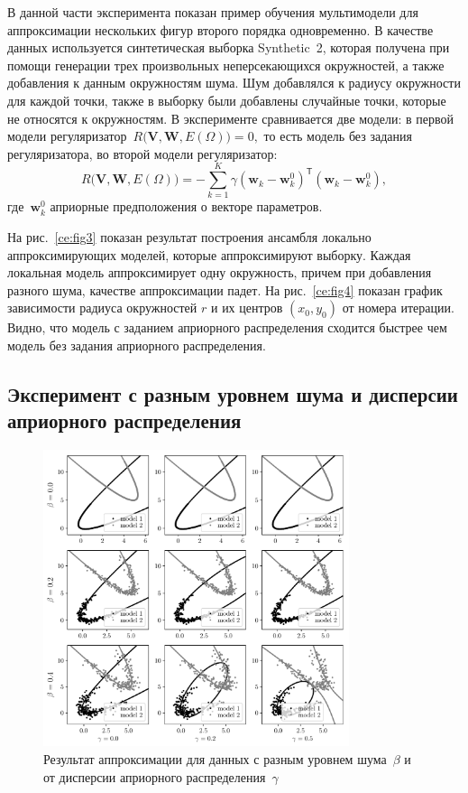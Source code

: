 \documentclass[12pt, twoside]{article}
\numberwithin{equation}{section}
\begin{document}
В данной части эксперимента показан пример обучения мультимодели для аппроксимации нескольких фигур второго порядка одновременно. В качестве данных используется синтетическая выборка Synthetic~2, которая получена при помощи генерации трех произвольных неперсекающихся окружностей, а также добавления к данным окружностям шума. Шум добавлялся к радиусу окружности для каждой точки, также в выборку были добавлены случайные точки, которые не относятся к окружностям. В эксперименте сравнивается две модели: в первой модели регуляризатор~$R\bigl(\mathbf{V}, \mathbf{W}, E(\Omega)\bigr)=0,$ то есть модель без задания регуляризатора, во второй модели регуляризатор:
\[
R\bigl(\mathbf{V}, \mathbf{W}, E(\Omega)\bigr)= -\sum_{k=1}^{K}\gamma\left(\mathbf{w}_k - \mathbf{w}_k^{0}\right)^{\mathsf{T}}\left(\mathbf{w}_k - \mathbf{w}_k^{0}\right),
\]
где~$\mathbf{w}_k^{0}$ априорные предположения о векторе параметров.

На рис.~\ref{ce:fig3} показан результат построения ансамбля локально аппроксимирующих моделей, которые аппроксимируют выборку. Каждая локальная модель аппроксимирует одну окружность, причем при добавления разного шума, качестве аппроксимации падет.
На рис.~\ref{ce:fig4} показан график зависимости радиуса окружностей $r$ и их центров $(x_0, y_0)$ от номера итерации. Видно, что модель с заданием априорного распределения сходится быстрее чем модель без задания априорного распределения.

\subsection{Эксперимент с разным уровнем шума и дисперсии априорного распределения}
\begin{figure}[h!t]\center
\includegraphics[width=0.8\textwidth]{figures/beta_gamma}
\caption{Результат аппроксимации для данных с разным уровнем шума~$\beta$ и от дисперсии априорного распределения~$\gamma$}
\label{ce:fig6}
\end{figure}
\end{document}
